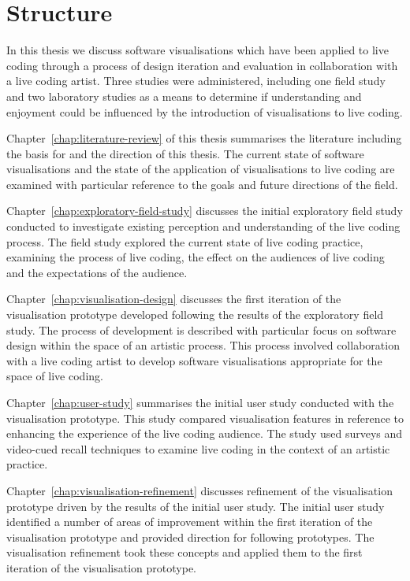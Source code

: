 \section{Structure}

In this thesis we discuss software visualisations which have been applied to live coding through a process of design iteration and evaluation in collaboration with a live coding artist. Three studies were administered, including one field study and two laboratory studies as a means to determine if understanding and enjoyment could be influenced by the introduction of visualisations to live coding.

Chapter~\ref{chap:literature-review} of this thesis summarises the literature including the basis for and the direction of this thesis. The current state of software visualisations and the state of the application of visualisations to live coding are examined with particular reference to the goals and future directions of the field.

Chapter~\ref{chap:exploratory-field-study} discusses the initial exploratory field study conducted to investigate existing perception and understanding of the live coding process. The field study explored the current state of live coding practice, examining the process of live coding, the effect on the audiences of live coding and the expectations of the audience.

Chapter~\ref{chap:visualisation-design} discusses the first iteration of the visualisation prototype developed following the results of the exploratory field study. The process of development is described with particular focus on software design within the space of an artistic process. This process involved collaboration with a live coding artist to develop software visualisations appropriate for the space of live coding.

Chapter~\ref{chap:user-study} summarises the initial user study conducted with the visualisation prototype. This study compared visualisation features in reference to enhancing the experience of the live coding audience. The study used surveys and video-cued recall techniques to examine live coding in the context of an artistic practice.

Chapter~\ref{chap:visualisation-refinement} discusses refinement of the visualisation prototype driven by the results of the initial user study. The initial user study identified a number of areas of improvement within the first iteration of the visualisation prototype and provided direction for following prototypes. The visualisation refinement took these concepts and applied them to the first iteration of the visualisation prototype.

